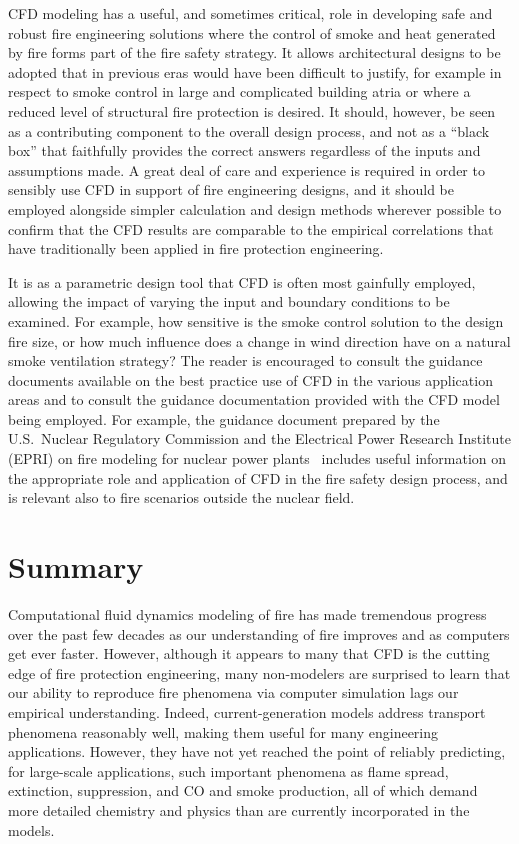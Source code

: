 \documentclass[graybox]{svmult}
\begin{document}
CFD modeling has a useful, and sometimes critical, role in developing safe and robust fire engineering solutions where the control of smoke and heat generated by fire forms part of the fire safety strategy. It allows architectural designs to be adopted that in previous eras would have been difficult to justify, for example in respect to smoke control in large and complicated building atria or where a reduced level of structural fire protection is desired. It should, however, be seen as a contributing component to the overall design process, and not as a ``black box'' that faithfully provides the correct answers regardless of the inputs and assumptions made. A great deal of care and experience is required in order to sensibly use CFD in support of fire engineering designs, and it should be employed alongside simpler calculation and design methods wherever possible to confirm that the CFD results are comparable to the empirical correlations that have traditionally been applied in fire protection engineering.

It is as a parametric design tool that CFD is often most gainfully employed, allowing the impact of varying the input and boundary conditions to be examined. For example, how sensitive is the smoke control solution to the design fire size, or how much influence does a change in wind direction have on a natural smoke ventilation strategy? The reader is encouraged to consult the guidance documents available on the best practice use of CFD in the various application areas and to consult the guidance documentation provided with the CFD model being employed. For example, the guidance document prepared by the U.S.~Nuclear Regulatory Commission and the Electrical Power Research Institute (EPRI) on fire modeling for nuclear power plants~\cite{Stroup:2012} includes useful information on the appropriate role and application of CFD in the fire safety design process, and is relevant also to fire scenarios outside the nuclear field.




\section{Summary}

Computational fluid dynamics modeling of fire has made tremendous progress over the past few decades as our understanding of fire improves and as computers get ever faster. However, although it appears to many that CFD is the cutting edge of fire protection engineering, many non-modelers are surprised to learn that our ability to reproduce fire phenomena via computer simulation lags our empirical understanding. Indeed, current-generation models address transport phenomena reasonably well, making them useful for many engineering applications. However, they have not yet reached the point of reliably predicting, for large-scale applications, such important phenomena as flame spread, extinction, suppression, and CO and smoke production, all of which demand more detailed chemistry and physics than are currently incorporated in the models.
\end{document}

